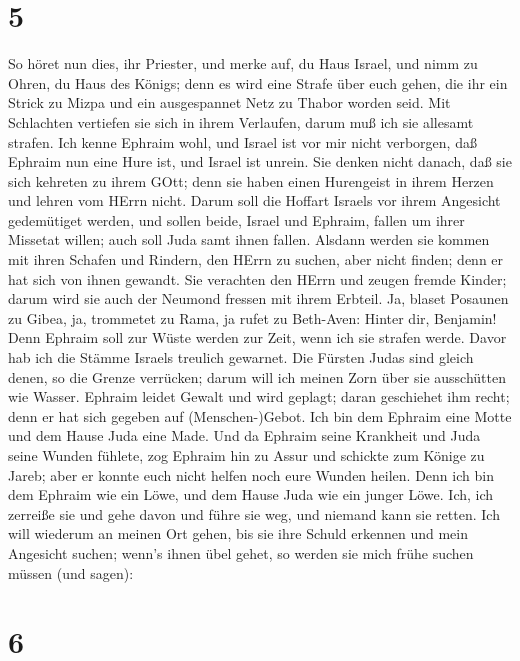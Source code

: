 \hypertarget{section-4}{%
\section{5}\label{section-4}}

 So höret nun dies, ihr Priester, und merke auf, du Haus
Israel, und nimm zu Ohren, du Haus des Königs; denn es wird eine Strafe
über euch gehen, die ihr ein Strick zu Mizpa und ein ausgespannet Netz
zu Thabor worden seid.  Mit Schlachten vertiefen sie sich in
ihrem Verlaufen, darum muß ich sie allesamt strafen.  Ich
kenne Ephraim wohl, und Israel ist vor mir nicht verborgen, daß Ephraim
nun eine Hure ist, und Israel ist unrein.  Sie denken nicht
danach, daß sie sich kehreten zu ihrem GOtt; denn sie haben einen
Hurengeist in ihrem Herzen und lehren vom HErrn nicht. 
Darum soll die Hoffart Israels vor ihrem Angesicht gedemütiget werden,
und sollen beide, Israel und Ephraim, fallen um ihrer Missetat willen;
auch soll Juda samt ihnen fallen.  Alsdann werden sie kommen
mit ihren Schafen und Rindern, den HErrn zu suchen, aber nicht finden;
denn er hat sich von ihnen gewandt.  Sie verachten den HErrn
und zeugen fremde Kinder; darum wird sie auch der Neumond fressen mit
ihrem Erbteil.  Ja, blaset Posaunen zu Gibea, ja, trommetet
zu Rama, ja rufet zu Beth-Aven: Hinter dir, Benjamin!  Denn
Ephraim soll zur Wüste werden zur Zeit, wenn ich sie strafen werde.
Davor hab ich die Stämme Israels treulich gewarnet.  Die
Fürsten Judas sind gleich denen, so die Grenze verrücken; darum will ich
meinen Zorn über sie ausschütten wie Wasser.  Ephraim
leidet Gewalt und wird geplagt; daran geschiehet ihm recht; denn er hat
sich gegeben auf (Menschen-)Gebot.  Ich bin dem Ephraim
eine Motte und dem Hause Juda eine Made.  Und da Ephraim
seine Krankheit und Juda seine Wunden fühlete, zog Ephraim hin zu Assur
und schickte zum Könige zu Jareb; aber er konnte euch nicht helfen noch
eure Wunden heilen.  Denn ich bin dem Ephraim wie ein Löwe,
und dem Hause Juda wie ein junger Löwe. Ich, ich zerreiße sie und gehe
davon und führe sie weg, und niemand kann sie retten.  Ich
will wiederum an meinen Ort gehen, bis sie ihre Schuld erkennen und mein
Angesicht suchen; wenn's ihnen übel gehet, so werden sie mich frühe
suchen müssen (und sagen):

\hypertarget{section-5}{%
\section{6}\label{section-5}}

